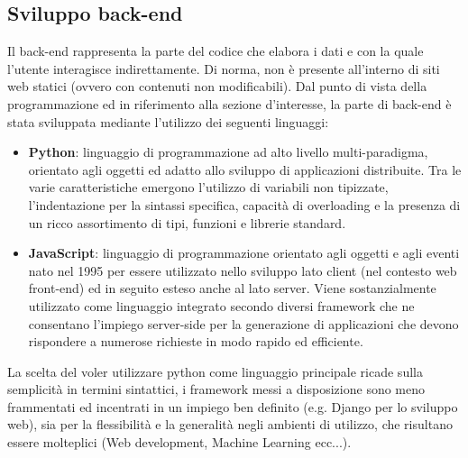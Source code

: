 \subsection{Sviluppo back-end}
Il back-end rappresenta la parte del codice che elabora i dati e con la quale l'utente interagisce indirettamente. Di norma, non è presente all'interno di siti web statici (ovvero con contenuti non modificabili).
Dal punto di vista della programmazione ed in riferimento alla sezione d'interesse, la parte di back-end è stata sviluppata mediante l'utilizzo dei seguenti linguaggi:
\begin{itemize}
    \item \textbf{Python}: linguaggio di programmazione ad alto livello multi-paradigma, orientato agli oggetti ed adatto allo sviluppo di applicazioni distribuite. Tra le varie caratteristiche emergono l'utilizzo di variabili non tipizzate, l'indentazione per la sintassi specifica, capacità di overloading e la presenza di un ricco assortimento di tipi, funzioni e librerie standard.
    \item \textbf{JavaScript}: linguaggio di programmazione orientato agli oggetti e agli eventi nato nel 1995 per essere utilizzato nello sviluppo lato client (nel contesto web front-end) ed in seguito esteso anche al lato server. Viene sostanzialmente utilizzato come linguaggio integrato secondo diversi framework che ne consentano l'impiego server-side per la generazione di applicazioni che devono rispondere a numerose richieste in modo rapido ed efficiente.
\end{itemize}
La scelta del voler utilizzare python come linguaggio principale ricade sulla semplicità in termini sintattici, i framework messi a disposizione sono meno frammentati ed incentrati in un impiego ben definito (e.g. Django per lo sviluppo web), sia per la flessibilità e la generalità negli ambienti di utilizzo, che risultano essere molteplici (Web development, Machine Learning ecc...).
